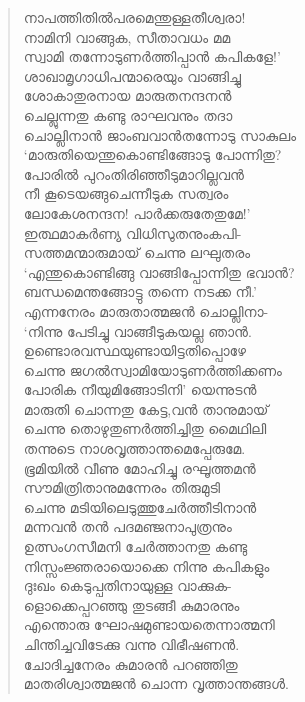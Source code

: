 \begin{verse}
നാപത്തിതില്‍പരമെന്തുള്ളതീശ്വരാ!\\
നാമിനി വാങ്ങുക, സീതാവധം മമ\\
സ്വാമി തന്നോടുണര്‍ത്തിപ്പാന്‍ കപികളേ!’\\
ശാഖാമൃഗാധിപന്മാരെയും വാങ്ങിച്ചു\\
ശോകാതുരനായ മാരുതനന്ദനന്‍\\
ചെല്ലുന്നതു കണ്ടു രാഘവനും തദാ\\
ചൊല്ലിനാന്‍ ജാംബവാന്‍തന്നോടു സാകുലം\\
‘മാരുതിയെന്തുകൊണ്ടിങ്ങോടു പോന്നിതു?\\
പോരില്‍ പുറംതിരിഞ്ഞീടുമാറില്ലവന്‍\\
നീ കൂടെയങ്ങുചെന്നീടുക സത്വരം\\
ലോകേശനന്ദന! പാര്‍ക്കരുതേതുമേ!’\\
ഇത്ഥമാകര്‍ണ്യ വിധിസുതനുംകപി-\\
സത്തമന്മാരുമായ് ചെന്നു ലഘുതരം\\
‘എന്തുകൊണ്ടിങ്ങു വാങ്ങിപ്പോന്നിതു ഭവാന്‍?\\
ബന്ധമെന്തങ്ങോട്ടു തന്നെ നടക്ക നീ.’\\
എന്നനേരം മാരുതാത്മജന്‍ ചൊല്ലിനാ-\\
‘നിന്നു പേടിച്ചു വാങ്ങീടുകയല്ല ഞാന്‍.\\
ഉണ്ടൊരവസ്ഥയുണ്ടായിട്ടതിപ്പൊഴേ\\
ചെന്നു ജഗല്‍സ്വാമിയോടുണര്‍ത്തിക്കണം\\
പോരിക നീയുമിങ്ങോടിനി’ യെന്നുടന്‍\\
മാരുതി ചൊന്നതു കേട്ട,വന്‍ താനുമായ്\\
ചെന്നു തൊഴുതുണര്‍ത്തിച്ചിതു മൈഥിലി\\
തന്നുടെ നാശവൃത്താന്തമെപ്പേരുമേ.\\
ഭൂമിയില്‍ വീണു മോഹിച്ചു രഘൂത്തമന്‍\\
സൗമിത്രിതാനുമന്നേരം തിരുമുടി\\
ചെന്നു മടിയിലെടുത്തുചേര്‍ത്തീടിനാന്‍\\
മന്നവന്‍ തന്‍ പദമഞ്ജനാപുത്രനും\\
ഉത്സംഗസീമനി ചേര്‍ത്താനതു കണ്ടു\\
നിസ്സംജ്ഞരായൊക്കെ നിന്നു കപികളും\\
ദുഃഖം കെടുപ്പതിനായുള്ള വാക്കുക-\\
ളൊക്കെപ്പറഞ്ഞു തുടങ്ങീ കുമാരനും\\
എന്തൊരു ഘോഷമുണ്ടായതെന്നാത്മനി\\
ചിന്തിച്ചവിടേക്കു വന്നു വിഭീഷണന്‍.\\
ചോദിച്ചനേരം കുമാരന്‍ പറഞ്ഞിതു\\
മാതരിശ്വാത്മജന്‍ ചൊന്ന വൃത്താന്തങ്ങള്‍.\\

\end{verse}
